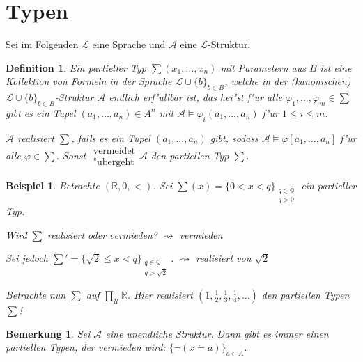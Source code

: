 \documentclass[a4paper,12pt,numbers=noenddot,parskip=full]{scrartcl}
\newcommand{\setQ}{\mathbb{Q}}
\newcommand{\setR}{\mathbb{R}}
\newcommand{\scrL}{\mathcal{L}}
\newcommand{\scrA}{\mathcal{A}}
\newcommand{\scrU}{\mathcal{U}}
\theoremstyle{dotless}
\newtheorem{definition}[theorem]{Definition}
\newtheorem{example}[theorem]{Beispiel}
\newtheorem{remark}[theorem]{Bemerkung}
\begin{document}
\section{Typen}
Sei im Folgenden $\scrL$ eine Sprache und $\scrA$ eine $\scrL$-Struktur.
\begin{definition}
	Ein partieller Typ $\sum (x_1, \dots, x_n)$ mit Parametern aus $B$ ist eine Kollektion von Formeln in der Sprache $\scrL \cup \{b\}_{b \in B}$, welche in der (kanonischen) $\scrL \cup \{b\}_{b \in B}$-Struktur $\scrA$ endlich erf"ullbar ist, das hei"st f"ur alle $\varphi_1, \dots, \varphi_m \in \sum$ gibt es ein Tupel $(a_1, \dots, a_n) \in A^n$ mit $\scrA \models \varphi_i(a_1, \dots, a_n)$ f"ur $1 \leq i \leq m$.
	
	$\scrA$ realisiert $\sum$, falls es ein Tupel $(a_1, \dots, a_n)$ gibt, sodass $\scrA \models \varphi[a_1, \dots, a_n]$ f"ur alle $\varphi \in \sum$. Sonst $\begin{array}{c}
		\text{vermeidet}\\ 
		\text{"ubergeht}
	\end{array} \scrA$ den partiellen Typ $\sum$. 
\end{definition}
\begin{example}
	Betrachte $(\setR, 0, <)$. Sei $\sum (x) = \{0 < x<q \}_{\substack{q \in \setQ \\ q>0}}$ ein partieller Typ.
	
	Wird $\sum$ realisiert oder vermieden? $\rightsquigarrow$ vermieden
	
	Sei jedoch $\sum' = \{\sqrt{2} \leq x < q \}_{\substack{q \in \setQ \\ q > \sqrt{2}}}$. $\rightsquigarrow$ realisiert von $\sqrt{2}$
	
	Betrachte nun $\sum$ auf $\prod\limits_{\scrU} \setR$. Hier realisiert $(1, \frac{1}{2}, \frac{1}{3}, \frac{1}{4}, \dots)$ den partiellen Typen $\sum$!
\end{example}
\begin{remark}
	Sei $\scrA$ eine unendliche Struktur. Dann gibt es immer einen partiellen Typen, der vermieden wird: $\{\lnot (x \dot= a) \}_{a \in A}$.
\end{remark}
\end{document}
